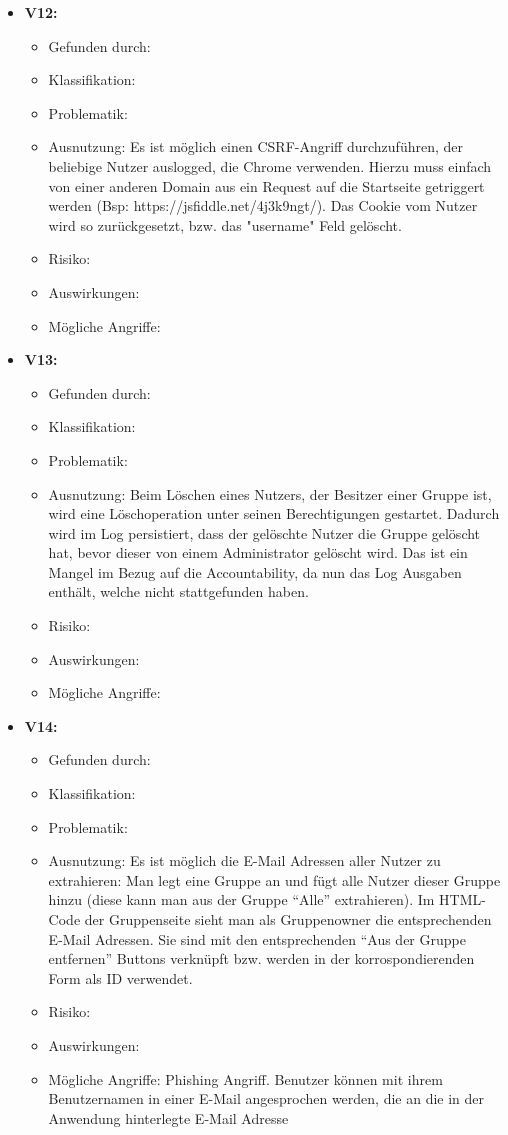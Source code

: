 \documentclass[12pt,DIV14,BCOR10mm,a4paper,parskip=half-,headsepline,headinclude,english,ngerman,bibliography=totocnumbered]{scrreprt}
\begin{document}
\begin{itemize}
  \hypertarget{vulnerability12}{}
  \item \textbf{V12: }
  \begin{itemize}
  \item Gefunden durch:
  \item Klassifikation: 
  \item Problematik:
  \item Ausnutzung: Es ist möglich einen CSRF-Angriff durchzuführen, der beliebige Nutzer auslogged, die Chrome verwenden. Hierzu muss einfach von einer anderen Domain aus ein Request auf die Startseite getriggert werden (Bsp: https://jsfiddle.net/4j3k9ngt/). Das Cookie vom Nutzer wird so zurückgesetzt, bzw. das "username" Feld gelöscht.
  \item Risiko: 
  \item Auswirkungen: 
  \item Mögliche Angriffe:
  \end{itemize}

  \hypertarget{vulnerability13}{}
  \item \textbf{V13: }
  \begin{itemize}
  \item Gefunden durch:
  \item Klassifikation: 
  \item Problematik:
  \item Ausnutzung: Beim Löschen eines Nutzers, der Besitzer einer Gruppe ist, wird eine Löschoperation unter seinen Berechtigungen gestartet. Dadurch wird im Log persistiert, dass der gelöschte Nutzer die Gruppe gelöscht hat, bevor dieser von einem Administrator gelöscht wird. Das ist ein Mangel im Bezug auf die Accountability, da nun das Log Ausgaben enthält, welche nicht stattgefunden haben.
  \item Risiko: 
  \item Auswirkungen: 
  \item Mögliche Angriffe:
  \end{itemize}

  \hypertarget{vulnerability14}{}
  \item \textbf{V14: }
  \begin{itemize}
  \item Gefunden durch:
  \item Klassifikation: 
  \item Problematik:
  \item Ausnutzung: Es ist möglich die E-Mail Adressen aller Nutzer zu extrahieren: Man legt eine Gruppe an und fügt alle Nutzer dieser Gruppe hinzu (diese kann man aus der Gruppe \enquote{Alle} extrahieren). Im HTML-Code der Gruppenseite sieht man als Gruppenowner die entsprechenden E-Mail Adressen. Sie sind mit den entsprechenden \enquote{Aus der Gruppe entfernen} Buttons verknüpft bzw. werden in der korrospondierenden Form als ID verwendet.
  \item Risiko: 
  \item Auswirkungen: 
  \item Mögliche Angriffe: Phishing Angriff. Benutzer können mit ihrem Benutzernamen in einer E-Mail angesprochen werden, die an die in der Anwendung hinterlegte E-Mail Adresse 
  \end{itemize}


\end{itemize}
\end{document}
